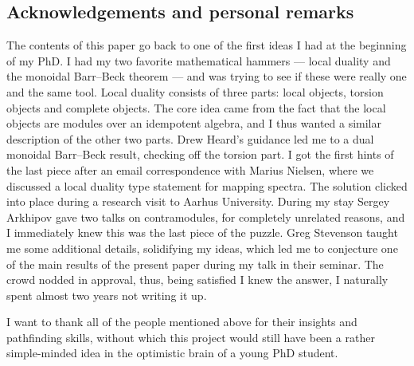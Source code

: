 


\subsection*{Acknowledgements and personal remarks}

The contents of this paper go back to one of the first ideas I had at the beginning of my PhD. I had my two favorite mathematical hammers --- local duality and the monoidal Barr--Beck theorem --- and was trying to see if these were really one and the same tool. Local duality consists of three parts: local objects, torsion objects and complete objects. The core idea came from the fact that the local objects are modules over an idempotent algebra, and I thus wanted a similar description of the other two parts. Drew Heard's guidance led me to a dual monoidal Barr--Beck result, checking off the torsion part. I got the first hints of the last piece after an email correspondence with Marius Nielsen, where we discussed a local duality type statement for mapping spectra. The solution clicked into place during a research visit to Aarhus University. During my stay Sergey Arkhipov gave two talks on contramodules, for completely unrelated reasons, and I immediately knew this was the last piece of the puzzle. Greg Stevenson taught me some additional details, solidifying my ideas, which led me to conjecture one of the main results of the present paper during my talk in their seminar. The crowd nodded in approval, thus, being satisfied I knew the answer, I naturally spent almost two years not writing it up. 

I want to thank all of the people mentioned above for their insights and pathfinding skills, without which this project would still have been a rather simple-minded idea in the optimistic brain of a young PhD student. 
